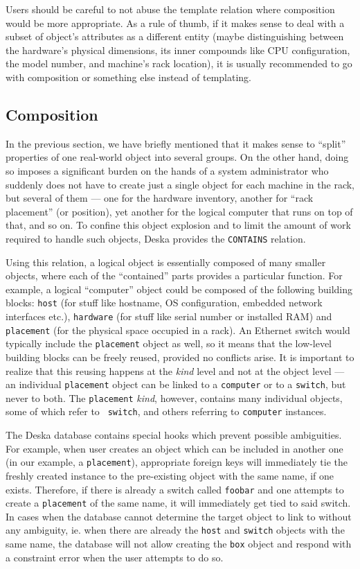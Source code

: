 \documentclass[deska]{subfiles}
\begin{document}
Users should be careful to not abuse the template relation where composition would be more appropriate.  As a rule of
thumb, if it makes sense to deal with a subset of object's attributes as a different entity (maybe distinguishing
between the hardware's physical dimensions, its inner compounds like CPU configuration, the model number, and machine's
rack location), it is usually recommended to go with composition or something else instead of templating.

\subsection{Composition}
\label{sec:relation-contains}

In the previous section, we have briefly mentioned that it makes sense to ``split'' properties of one real-world object
into several groups.  On the other hand, doing so imposes a significant burden on the hands of a system administrator
who suddenly does not have to create just a single object for each machine in the rack, but several of them --- one for
the hardware inventory, another for ``rack placement'' (or position), yet another for the logical computer that runs on
top of that, and so on.  To confine this object explosion and to limit the amount of work required to handle such
objects, Deska provides the {\tt CONTAINS} relation.

Using this relation, a logical object is essentially composed of many smaller objects, where each of the ``contained''
parts provides a particular function.  For example, a logical ``computer'' object could be composed of the following
building blocks: {\tt host} (for stuff like hostname, OS configuration, embedded network interfaces etc.), {\tt hardware} (for stuff like
serial number or installed RAM) and {\tt placement} (for the physical space occupied in a rack).  An Ethernet switch would typically
include the {\tt placement} object as well, so it means that the low-level building blocks can be freely reused,
provided no conflicts arise.  It is important to realize that this reusing happens at the {\em kind} level and not at
the object level ---  an individual {\tt placement} object can be linked to a {\tt computer} or to a {\tt switch}, but
never to both.  The {\tt placement} {\em kind}, however, contains many individual objects, some of which refer to {\tt
switch}, and others referring to {\tt computer} instances.

The Deska database contains special hooks which prevent possible ambiguities. For example, when user creates an object
which can be included in another one (in our example, a {\tt placement}), appropriate foreign keys will immediately tie
the freshly created instance to the pre-existing object with the same name, if one exists.  Therefore, if there is
already a switch called {\tt foobar} and one attempts to create a {\tt placement} of the same name, it will immediately
get tied to said switch.  In cases when the database cannot determine the target object to link to without any
ambiguity, ie. when there are already the {\tt host} and {\tt switch} objects with the same name, the database will not
allow creating the {\tt box} object and respond with a constraint error when the user attempts to do so.
\end{document}
